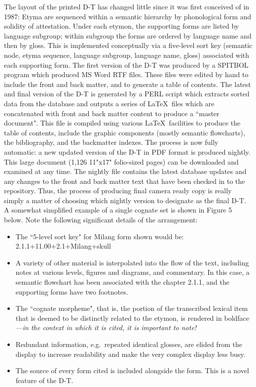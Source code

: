 The layout of the printed D-T has changed little since it was first conceived of in 1987: Etyma are sequenced within a semantic hierarchy by phonological form and solidity of attestation.  Under each etymon, the supporting forms are listed by language subgroup; within subgroup the forms are ordered by language name and then by gloss.  This is implemented conceptually via a five-level sort key (semantic node, etyma sequence, language subgroup, language name, gloss) associated with each supporting form.   The first version of the D-T was produced by a SPITBOL program which produced MS Word RTF files. These files were edited by hand to include the front and back matter, and to generate a table of contents. The latest and final version of the D-T is generated by a PERL script which extracts sorted data from the database and outputs a series of \LaTeX\  files which are concatenated with front and back matter content to produce a ``master document".  This file is compiled using various \LaTeX\  facilities to produce the table of contents, include the graphic components (mostly semantic flowcharts), the bibliography, and the backmatter indexes.  The process is now fully automatic: a new updated version of the D-T in PDF format is produced nightly. This large document (1,126 11"x17" folio-sized pages) can be downloaded and examined at any time.  The nightly file contains the latest database updates and any changes to the front and back matter text that have been checked in to the repository. Thus, the process of producing final camera ready copy is really simply a matter of choosing which nightly version to designate as the final D-T.
A somewhat simplified example of a single cognate set is shown in
Figure 5 below. Note the following significant details of the
arrangement:
\begin{itemize}
\item  The ``5-level sort key" for Milang form shown would be: 
2.1.1+11.00+2.1+Milang+skull
\item  A variety of other material is interpolated into the flow of the text, including notes at various levels, figures and diagrams, and commentary. In this case, a semantic flowchart has been associated with the chapter 2.1.1, and the supporting forms have two footnotes.
\item  The ``cognate morpheme", that is, the portion of the transcribed
  lexical item that is deemed to be distinctly related to the etymon,
  is rendered in boldface---{\it in the context in which it is cited,
    it is important to note!}
\item  Redundant information, e.g.\ repeated identical glosses, are elided from the display to increase readability and make the very complex display less busy.
\item  The source of every form cited is included alongside the
form. This is a novel feature of the D-T.
\end{itemize}

